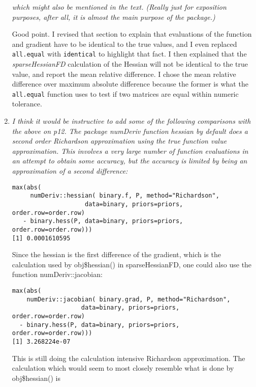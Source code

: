 \documentclass{article}
\newcommand{\code}[1]{\texttt{#1}}
\newcommand{\func}[1]{\code{#1}}
\newcommand{\class}[1]{\textsl{#1}}
\newenvironment{revQuote}{\itshape}{\vspace{\baselineskip}}
\newenvironment{response}{\normalfont}{\vspace{\baselineskip}}
\begin{document}
\begin{enumerate}
\begin{revQuote}
which might also be mentioned in the text. (Really just for exposition
purposes, after all, it is almost the main purpose of the package.)
  \end{revQuote}

\begin{response}
  Good point.  I revised that section to explain that evaluations of
  the function and gradient have to be identical to the true values,
  and I even replaced \func{all.equal} with \func{identical} to
  highlight that fact. I then explained that the
  \class{sparseHessianFD} calculation of the Hessian will not be
  identical to the true value, and report the mean relative
  difference.  I chose the mean relative difference over maximum
  absolute difference because the former is what the \func{all.equal}
  function uses to test if two matrices are equal within numeric tolerance.
\end{response}


\item \begin{revQuote}
I think it would be instructive to add some of the following comparisons
with the above on p12.  The package numDeriv function hessian by default
does a second order Richardson approximation using the true function value
approximation. This involves a very large number of function evaluations in
an attempt to obtain some accuracy, but the accuracy is limited by being an
approximation of a second difference:
\begin{verbatim}
max(abs(
     numDeriv::hessian( binary.f, P, method="Richardson", 
                    data=binary, priors=priors,
order.row=order.row) 
   - binary.hess(P, data=binary, priors=priors, order.row=order.row)))
[1] 0.0001610595

\end{verbatim}

Since the hessian is the first difference of the gradient, which is the
calculation used by obj\$hessian() in sparseHessianFD, one could also use the
function numDeriv::jacobian:

\begin{verbatim}
max(abs( 
    numDeriv::jacobian( binary.grad, P, method="Richardson", 
                   data=binary, priors=priors,
order.row=order.row)
  - binary.hess(P, data=binary, priors=priors, order.row=order.row)))
[1] 3.268224e-07
\end{verbatim}

This is still doing the calculation intensive Richardson approximation. The
calculation which would seem to most closely resemble what is done by
obj\$hessian() is


\end{revQuote}
\end{enumerate}
\end{document}
